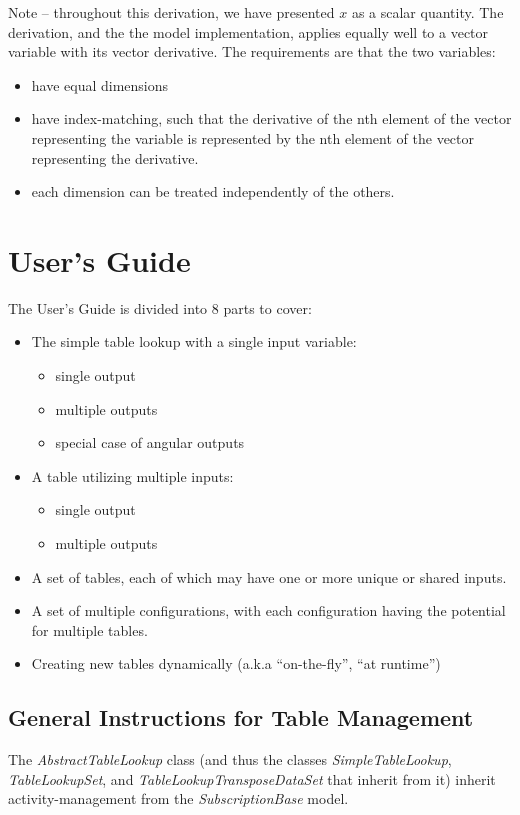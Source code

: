 \documentclass[11pt,fleqn]{report}
\begin{document}
Note -- throughout this derivation, we have presented $x$ as a scalar quantity.
The derivation, and the the model implementation, applies equally well to a
vector variable with its vector derivative. The requirements are that the
two variables:
\begin{itemize}
\item have equal dimensions
\item have index-matching, such that the derivative of the nth element of
      the vector representing the variable is represented by the nth element of
      the vector representing the derivative.
\item each dimension can be treated independently of the others.
\end{itemize}


\chapter{User's Guide}
The User's Guide is divided into 8 parts to cover:
\begin{itemize}
 \item The simple table lookup with a single input variable:
 \begin{itemize}
  \item single output
  \item multiple outputs
  \item special case of angular outputs
 \end{itemize}
 \item A table utilizing multiple inputs:
  \begin{itemize}
  \item single output
  \item multiple outputs
 \end{itemize}
 \item A set of tables, each of which may have one or more unique or shared
       inputs.
 \item A set of multiple configurations, with each configuration having
       the potential for multiple tables.
 \item Creating new tables dynamically (a.k.a ``on-the-fly'', ``at runtime'')
\end{itemize}

\section{General Instructions for Table Management} \label{sec:UG_tab_mgr}
The \textit{AbstractTableLookup} class (and thus the classes
 \textit{SimpleTableLookup}, \textit{TableLookupSet}, and
 \textit{TableLookupTransposeDataSet} that inherit from it)
inherit activity-management from the \textit{SubscriptionBase} model.
\end{document}
